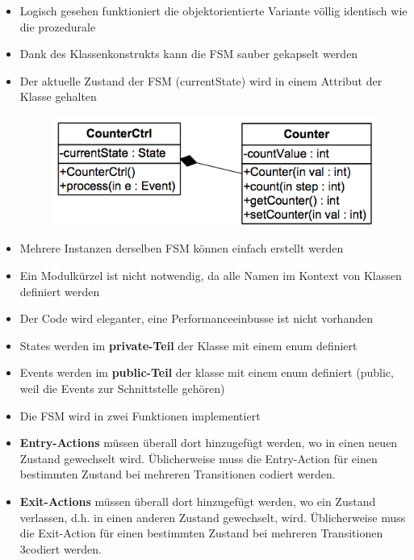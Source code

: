 \begin{itemize}
  \item Logisch gesehen funktioniert die objektorientierte Variante völlig identisch wie die prozedurale
  \item Dank des Klassenkonstrukts kann die FSM sauber gekapselt werden
  \item Der aktuelle Zustand der FSM (currentState) wird in einem Attribut der Klasse gehalten
  \begin{figure}[h]
    \centering
    \includegraphics[scale = 0.35]{images/FSM/klasseCounter}
  \end{figure}
  \item Mehrere Instanzen derselben FSM können einfach erstellt werden
  \item Ein Modulkürzel ist nicht notwendig, da alle Namen im Kontext von Klassen definiert werden
  \item Der Code wird eleganter, eine Performanceeinbusse ist nicht vorhanden
  \item States werden im \textbf{private-Teil} der Klasse mit einem enum definiert
  
  \item Events werden im \textbf{public-Teil} der klasse mit einem enum definiert (public, weil die Events zur Schnittstelle gehören)
  
  \item Die FSM wird in zwei Funktionen implementiert
  
  \item \textbf{Entry-Actions} müssen überall dort hinzugefügt werden, wo in einen neuen Zustand gewechselt wird. Üblicherweise muss die Entry-Action für einen bestimmten Zustand bei mehreren Transitionen codiert werden.
  \item \textbf{Exit-Actions} müssen überall dort hinzugefügt werden, wo ein Zustand verlassen, d.h. in einen anderen Zustand gewechselt, wird. Üblicherweise muss die Exit-Action für einen bestimmten Zustand bei mehreren Transitionen 3codiert werden.
\end{itemize}

